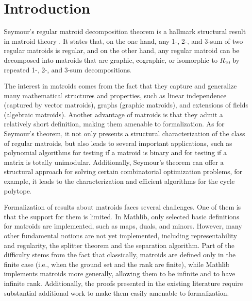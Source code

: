 \section{Introduction}

Seymour's regular matroid decomposition theorem is a hallmark structural result in matroid theory \cite{Oxley2011,Truemper2016,Geelen2005}. It states that, on the one hand, any 1-, 2-, and 3-sum of two regular matroids is regular, and on the other hand, any regular matroid can be decomposed into matroids that are graphic, cographic, or isomorphic to $R_{10}$ by repeated 1-, 2-, and 3-sum decompositions.

The interest in matroids comes from the fact that they capture and generalize many mathematical structures and properties, such as linear independence (captured by vector matroids), graphs (graphic matroids), and extensions of fields (algebraic matroids). Another advantage of matroids is that they admit a relatively short definition, making them amenable to formalization. As for Seymour's theorem, it not only presents a structural characterization of the class of regular matroids, but also leads to several important applications, such as polynomial algorithms for testing if a matroid is binary and for testing if a matrix is totally unimodular. Additionally, Seymour's theorem can offer a structural approach for solving certain combinatorial optimization problems, for example, it leads to the characterization and efficient algorithms for the cycle polytope.

Formalization of results about matroids faces several challenges. One of them is that the support for them is limited. In Mathlib, only selected basic definitions for matroids are implemented, such as maps, duals, and minors. However, many other fundamental notions are not yet implemented, including representability and regularity, the splitter theorem and the separation algorithm. Part of the difficulty stems from the fact that classically, matroids are defined only in the finite case (i.e., when the ground set and the rank are finite), while Mathlib implements matroids more generally, allowing them to be infinite and to have infinite rank. Additionally, the proofs presented in the existing literature require substantial additional work to make them easily amenable to formalization.

